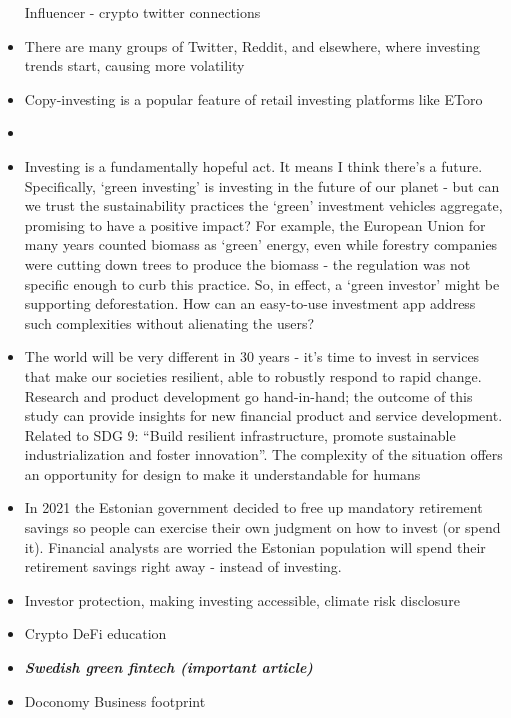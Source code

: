\documentclass[
  letterpaper,
  DIV=11,
  numbers=noendperiod]{scrartcl}
\begin{document}
\begin{itemize}
  Influencer - crypto twitter connections
\item
  There are many groups of Twitter, Reddit, and elsewhere, where
  investing trends start, causing more volatility
\item
  Copy-investing is a popular feature of retail investing platforms like
  EToro
\item
  \citet{irenezhaoHereWhy0xIreneDao2022}
\item
  Investing is a fundamentally hopeful act. It means I think there's a
  future. Specifically, `green investing' is investing in the future of
  our planet - but can we trust the sustainability practices the `green'
  investment vehicles aggregate, promising to have a positive impact?
  For example, the European Union for many years counted biomass as
  `green' energy, even while forestry companies were cutting down trees
  to produce the biomass - the regulation was not specific enough to
  curb this practice. So, in effect, a `green investor' might be
  supporting deforestation. How can an easy-to-use investment app
  address such complexities without alienating the users?
\item
  The world will be very different in 30 years - it's time to invest in
  services that make our societies resilient, able to robustly respond
  to rapid change. Research and product development go hand-in-hand; the
  outcome of this study can provide insights for new financial product
  and service development. Related to SDG 9: ``Build resilient
  infrastructure, promote sustainable industrialization and foster
  innovation''. The complexity of the situation offers an opportunity
  for design to make it understandable for humans
\item
  In 2021 the Estonian government decided to free up mandatory
  retirement savings so people can exercise their own judgment on how to
  invest (or spend it). Financial analysts are worried the Estonian
  population will spend their retirement savings right away - instead of
  investing.
\item
  \citet{garygenslerWeHaveActive2022} Investor protection, making
  investing accessible, climate risk disclosure
\item
  \citet{LetsDeFiDeFi} Crypto DeFi education
\item
  \citet{MeetFintechsLeading2021} \textbf{\emph{Swedish green fintech
  (important article)}}
\item
  \citet{DoconomyAnnouncesLargest2021} Doconomy Business footprint
\end{itemize}
\end{document}
